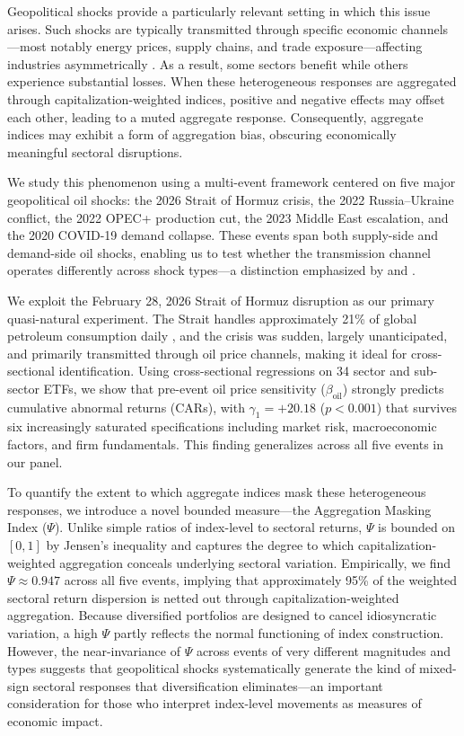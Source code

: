 \documentclass[12pt,preprint,authoryear]{elsarticle}
\begin{document}
Geopolitical shocks provide a particularly relevant setting in which this issue arises. Such shocks are typically transmitted through specific economic channels---most notably energy prices, supply chains, and trade exposure---affecting industries asymmetrically \citep{kilian2009not,caldara2022measuring,smales2021geopolitical,antonakakis2017oil}. As a result, some sectors benefit while others experience substantial losses. When these heterogeneous responses are aggregated through capitalization-weighted indices, positive and negative effects may offset each other, leading to a muted aggregate response. Consequently, aggregate indices may exhibit a form of aggregation bias, obscuring economically meaningful sectoral disruptions.

We study this phenomenon using a multi-event framework centered on five major geopolitical oil shocks: the 2026 Strait of Hormuz crisis, the 2022 Russia--Ukraine conflict, the 2022 OPEC+ production cut, the 2023 Middle East escalation, and the 2020 COVID-19 demand collapse. These events span both supply-side and demand-side oil shocks, enabling us to test whether the transmission channel operates differently across shock types---a distinction emphasized by \citet{kilian2009not} and \citet{kilian2009impact}.

We exploit the February 28, 2026 Strait of Hormuz disruption as our primary quasi-natural experiment. The Strait handles approximately 21\% of global petroleum consumption daily \citep{eia2023hormuz}, and the crisis was sudden, largely unanticipated, and primarily transmitted through oil price channels, making it ideal for cross-sectional identification. Using cross-sectional regressions on 34 sector and sub-sector ETFs, we show that pre-event oil price sensitivity ($\beta_{\text{oil}}$) strongly predicts cumulative abnormal returns (CARs), with $\gamma_1 = +20.18$ ($p < 0.001$) that survives six increasingly saturated specifications including market risk, macroeconomic factors, and firm fundamentals. This finding generalizes across all five events in our panel.

To quantify the extent to which aggregate indices mask these heterogeneous responses, we introduce a novel bounded measure---the Aggregation Masking Index ($\Psi$). Unlike simple ratios of index-level to sectoral returns, $\Psi$ is bounded on $[0,1]$ by Jensen's inequality and captures the degree to which capitalization-weighted aggregation conceals underlying sectoral variation. Empirically, we find $\Psi \approx 0.947$ across all five events, implying that approximately 95\% of the weighted sectoral return dispersion is netted out through capitalization-weighted aggregation. Because diversified portfolios are designed to cancel idiosyncratic variation, a high $\Psi$ partly reflects the normal functioning of index construction. However, the near-invariance of $\Psi$ across events of very different magnitudes and types suggests that geopolitical shocks systematically generate the kind of mixed-sign sectoral responses that diversification eliminates---an important consideration for those who interpret index-level movements as measures of economic impact.
\end{document}
